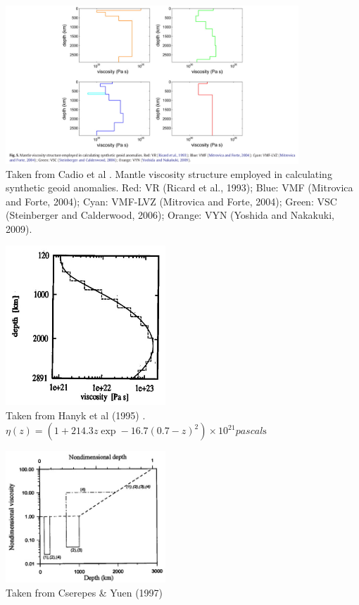 \begin{center}
\includegraphics[width=11cm]{images/viscosity_profile/capd11}\\
{\captionfont Taken from Cadio et al \cite{capd11}.
Mantle viscosity structure employed in calculating synthetic geoid anomalies. 
Red: VR (Ricard et al., 1993); Blue: VMF (Mitrovica and Forte, 2004); Cyan: VMF-LVZ (Mitrovica
and Forte, 2004); Green: VSC (Steinberger and Calderwood, 2006); Orange: VYN (Yoshida and Nakakuki, 2009).}
\end{center}

\begin{center}
\includegraphics[width=6cm]{images/viscosity_profile/hamy95}\\
{\captionfont Taken from Hanyk et al (1995) \cite{hamy95}. 
$\eta(z)=(1+214.3z\exp-16.7(0.7-z)^2)\times 10^{21}\si{pascal\second}$ }
\end{center}

\begin{center}
\includegraphics[width=6cm]{images/viscosity_profile/csyu97}\\
{\captionfont Taken from Cserepes \& Yuen (1997) \cite{csyu97}} 
\end{center}



